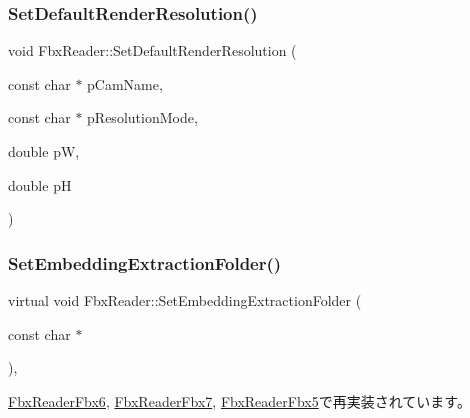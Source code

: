 \mbox{\label{class_fbx_reader_a57209dd75b739a6234bd21212f447215}} 
\subsubsection{\texorpdfstring{Set\+Default\+Render\+Resolution()}{SetDefaultRenderResolution()}}
{\footnotesize\ttfamily void Fbx\+Reader\+::\+Set\+Default\+Render\+Resolution (\begin{DoxyParamCaption}\item[{const char $\ast$}]{p\+Cam\+Name,  }\item[{const char $\ast$}]{p\+Resolution\+Mode,  }\item[{double}]{pW,  }\item[{double}]{pH }\end{DoxyParamCaption})\hspace{0.3cm}{\ttfamily [protected]}}

\mbox{\label{class_fbx_reader_a640eef510ddb298b2eaad0545b79de66}} 
\subsubsection{\texorpdfstring{Set\+Embedding\+Extraction\+Folder()}{SetEmbeddingExtractionFolder()}}
{\footnotesize\ttfamily virtual void Fbx\+Reader\+::\+Set\+Embedding\+Extraction\+Folder (\begin{DoxyParamCaption}\item[{const char $\ast$}]{ }\end{DoxyParamCaption})\hspace{0.3cm}{\ttfamily [inline]}, {\ttfamily [virtual]}}



\hyperlink{class_fbx_reader_fbx6_a574e93fb5fc9fd89050b11c383316ab2}{Fbx\+Reader\+Fbx6}, \hyperlink{class_fbx_reader_fbx7_a411118263811ffa136e233abfb5a0d02}{Fbx\+Reader\+Fbx7}, \hyperlink{class_fbx_reader_fbx5_ab910914828f297f51c28d88f466d6928}{Fbx\+Reader\+Fbx5}で再実装されています。



